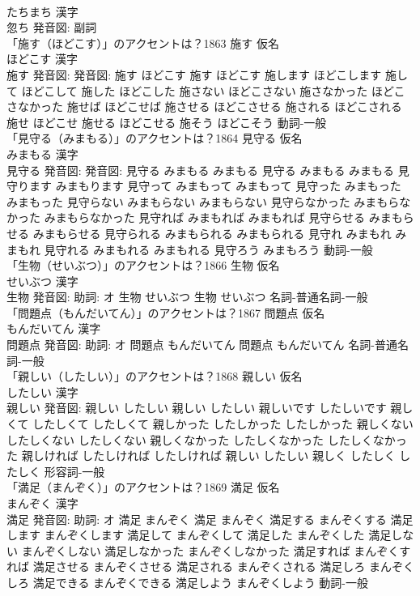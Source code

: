 \documentclass[8pt]{extreport}
\begin{document}
\begin{CJK}{UTF8}{min}
\\	たちまち 漢字　
\\	忽ち 発音図:							副詞 
\\	「施す（ほどこす）」のアクセントは？1863	施す 仮名　
\\	ほどこす 漢字　
\\	施す 発音図: 発音図:	施す ほどこす		施す ほどこす 施します ほどこします 施して ほどこして 施した ほどこした 施さない ほどこさない 施さなかった ほどこさなかった 施せば ほどこせば 施させる ほどこさせる 施される ほどこされる 施せ ほどこせ 施せる ほどこせる 施そう ほどこそう				動詞-一般 
\\	「見守る（みまもる）」のアクセントは？1864	見守る 仮名　
\\	みまもる 漢字　
\\	見守る 発音図: 発音図:	見守る みまもる みまもる		見守る みまもる みまもる 見守ります みまもります 見守って みまもって みまもって 見守った みまもった みまもった 見守らない みまもらない みまもらない 見守らなかった みまもらなかった みまもらなかった 見守れば みまもれば みまもれば 見守らせる みまもらせる みまもらせる 見守られる みまもられる みまもられる 見守れ みまもれ みまもれ 見守れる みまもれる みまもれる 見守ろう みまもろう				動詞-一般 
\\	「生物（せいぶつ）」のアクセントは？1866	生物 仮名　
\\	せいぶつ 漢字　
\\	生物 発音図: 助詞: オ	生物 せいぶつ		生物 せいぶつ				名詞-普通名詞-一般 
\\	「問題点（もんだいてん）」のアクセントは？1867	問題点 仮名　
\\	もんだいてん 漢字　
\\	問題点 発音図: 助詞: オ	問題点 もんだいてん		問題点 もんだいてん				名詞-普通名詞-一般 
\\	「親しい（したしい）」のアクセントは？1868	親しい 仮名　
\\	したしい 漢字　
\\	親しい 発音図:	親しい したしい		親しい したしい 親しいです したしいです 親しくて したしくて したしくて 親しかった したしかった したしかった 親しくない したしくない したしくない 親しくなかった したしくなかった したしくなかった 親しければ したしければ したしければ 親しい したしい 親しく したしく したしく				形容詞-一般 
\\	「満足（まんぞく）」のアクセントは？1869	満足 仮名　
\\	まんぞく 漢字　
\\	満足 発音図: 助詞: オ	満足 まんぞく		満足 まんぞく 満足する まんぞくする 満足します まんぞくします 満足して まんぞくして 満足した まんぞくした 満足しない まんぞくしない 満足しなかった まんぞくしなかった 満足すれば まんぞくすれば 満足させる まんぞくさせる 満足される まんぞくされる 満足しろ まんぞくしろ 満足できる まんぞくできる 満足しよう まんぞくしよう				動詞-一般 

\end{CJK}
\end{document}
